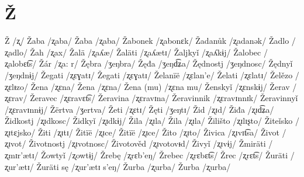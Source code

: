 \chapter{Ž} 

Ž /ʐ/
Žaba /ʐaba/
Žaba /ʐaba/
Žabonek /ʐabonɛk/
Žadanůk /ʐadanək/
Žadlo /ʐadlo/
Žah /ʐax/
Žalä /ʐaʎæ/
Žaläti /ʐaʎætɪ/
Žaljkyǐ /ʐaʎkɨj/
Žalobec /ʐalobɛt͡s/
Žár /ʐa: r/
Žębra /ʒeŋbra/
Žęđa /ʒeŋd͡ʑa/
Žędnostj /ʒeŋdnosc/
Žędnyǐ /ʒeŋdnɨj/
Žegati /ʐɛɣatɪ/
Žegati /ʐɛɣatɪ/
Želanïë /ʐɛlan’e/
Želati /ʐɛlatɪ/
Želězo /ʐɛlᵻzo/
Žena /ʐɛna/
Žena /ʐɛna/
Žena (mu) /ʐɛna mu/
Ženskyǐ /ʐɛnskɨj/
Žerav /ʐɛrav/
Žeravec /ʐɛravɛt͡s/
Žeravina /ʐɛravɪna/
Žeravinnik /ʐɛravɪnnɪk/
Žeravinnyǐ /ʐɛravɪnnɨj/
Žërtva /ʒertva/
Žeti /ʐɛtɪ/
Žęti /ʒeŋtɪ/
Žid /ʐɪd/
Žiđa /ʐɪd͡ʑa/
Židkostj /ʐɪdkosc/
Židkyǐ /ʐɪdkɨj/
Žila /ʐɪla/
Žila /ʐɪla/
Žilišto /ʐɪlɪʂto/
Žiteǐsko /ʐɪtɛjsko/
Žiti /ʐɪtɪ/
Žitïë /ʐɪce/
Žitïë /ʐɪce/
Žito /ʐɪto/
Živica /ʐɪvɪt͡sa/
Život /ʐɪvot/
Životnostj /ʐɪvotnosc/
Životověd /ʐɪvotovᵻd/
Živyǐ /ʐɪvɨj/
Žmiräti /ʐmɪr’ætɪ/
Žowtyǐ /ʐowtɨj/
Žrebę /ʐrɛb’eŋ/
Žrebec /ʐrɛbɛt͡s/
Žrec /ʐrɛt͡s/
Žuräti /ʐur’ætɪ/
Žuräti sę /ʐur’ætɪ s’eŋ/
Žurba /ʐurba/
Žurba /ʐurba/